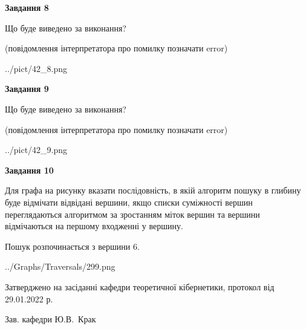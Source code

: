 \documentclass[12pt, ukrainian]{article}
\begin{document}
{\begin {large}
{\begin {center}\textbf{Завдання 8}\end {center}}\par
Що буде виведено за виконання?\par
 (повідомлення інтерпретатора про помилку позначати error)
\begin{center}
	{../pict/42_8.png}
\end{center}
\newpage

{\begin {center}\textbf{Завдання 9}\end {center}}\par
Що буде виведено за виконання?\par
 (повідомлення інтерпретатора про помилку позначати error)\par
\begin{center}
	{../pict/42_9.png}
\end{center}
\newpage

{\begin {center}\textbf{Завдання 10}\end {center}}\par
Для графа на рисунку вказати послідовність, в якій алгоритм пошуку в глибину буде відмічати відвідані вершини, якщо списки суміжності вершин переглядаються алгоритмом за зростанням міток вершин та вершини відмічаються на першому вход\-женні у вершину.\par
Пошук розпочинається з вершини 6.\par

\begin{center}
	{../Graphs/Traversals/299.png}
\end{center}\par
\newpage


\end {large}
}
{\smallskip \begin {small} Затверджено на засіданні кафедри теоретичної кібернетики, протокол  від   29.01.2022 р.\par\smallskip\smallskip
{\parbox {6.5 cm}{Зав. кафедри \dotfill Ю.В.~Крак}} \end{small}}
\end{document}
